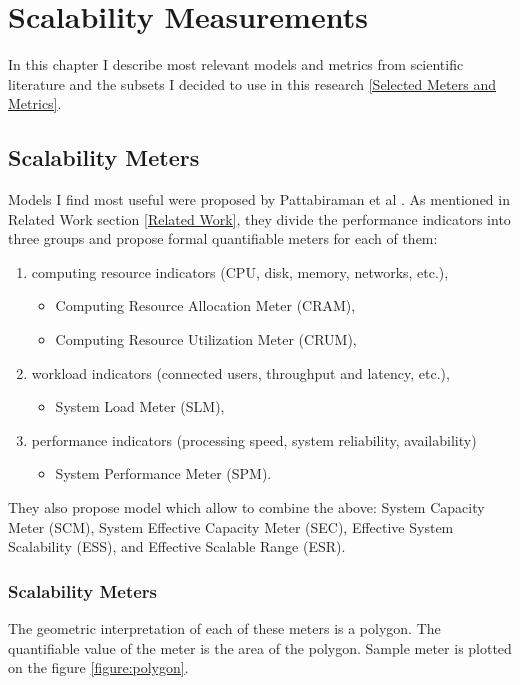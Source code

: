 \documentclass{uvamscse}
\begin{document}
\chapter{Scalability Measurements} \label{Scalability Measurements}
In this chapter I describe most relevant models and metrics from scientific literature and the subsets I decided to use in this research \ref{Selected Meters and Metrics}.

\section{Scalability Meters}
Models I find most useful were proposed by Pattabiraman et al \cite{Models}. As mentioned in Related Work section \ref{Related Work}, they divide the performance indicators into three groups and propose formal quantifiable meters for each of them:
\begin{enumerate}
  \item computing resource indicators (CPU, disk, memory, networks, etc.),
  \begin{itemize}
    \item Computing Resource Allocation Meter (CRAM),
    \item Computing Resource Utilization Meter (CRUM),
  \end{itemize}
  \item workload indicators (connected users, throughput and latency, etc.),
  \begin{itemize}
    \item System Load Meter (SLM),
  \end{itemize}
  \item performance indicators (processing speed, system reliability, availability)
  \begin{itemize}
    \item System Performance Meter (SPM).
  \end{itemize}
\end{enumerate}
They also propose model which allow to combine the above: System Capacity Meter (SCM), System Effective Capacity Meter (SEC), Effective System Scalability (ESS), and Effective Scalable Range (ESR).

\subsection{Scalability Meters}

The geometric interpretation of each of these meters is a polygon. The quantifiable value of the meter is the area of the polygon. Sample meter is plotted on the figure \ref{figure:polygon}.
\end{document}
